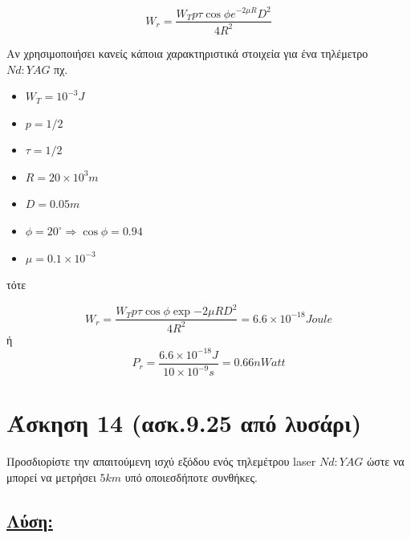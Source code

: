 \documentclass[a4paper,11pt,titlepage]{article}
\newcommand{\degrees}{^{\circ}}
\begin{document}
\begin{equation}
 W_r=\dfrac{W_T p \tau\cos\phi e^{-2\mu R}D^2}{4R^2}
\end{equation}

Αν χρησιμοποιήσει κανείς κάποια χαρακτηριστικά στοιχεία για ένα τηλέμετρο $Nd:YAG$ πχ.
\begin{itemize}
 \item $W_T=10^{-3}J$
 \item $p=1/2$
 \item $\tau=1/2$
 \item $R=20\times10^3m$
 \item $D=0.05m$
 \item $\phi=20\degrees\Longrightarrow \cos\phi=0.94$
 \item $\mu=0.1\times10^{-3}$
\end{itemize}

τότε

\begin{equation}
 W_r=\dfrac{W_T p \tau\cos{\phi}\exp{-2\mu R}D^2}{4R^2}=6.6\times10^{-18}Joule
\end{equation}
ή
\begin{equation}
 P_r=\dfrac{6.6\times10^{-18}J}{10\times10^{-9}s}=0.66nWatt
\end{equation}

\section{Άσκηση 14 (ασκ.9.25 από λυσάρι)}

Προσδιορίστε την απαιτούμενη ισχύ εξόδου ενός τηλεμέτρου laser $Nd:YAG$ ώστε να μπορεί να μετρήσει $5km$ υπό οποιεσδήποτε συνθήκες.

\subsection*{\underline{Λύση:}}
\end{document}
